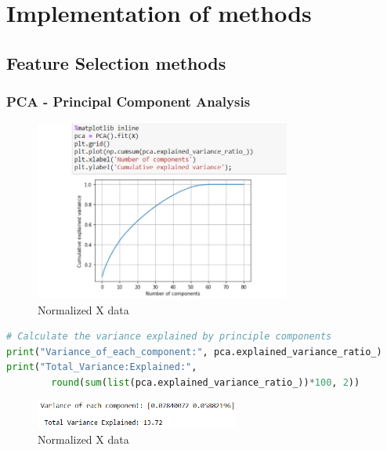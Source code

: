 \chapter{Implementation of methods}
\label{cha:implementation_methods}

\section{Feature Selection methods} %
\label{sec:feature_selection}

\subsection{PCA - Principal Component Analysis} %
\label{sec:pca}

\begin{figure}[h]
    \centering
    \includegraphics[width=0.75\textwidth,height=0.3\textheight]{Chapters/Figures/pca_components.png}
    \caption{Normalized X data}
    \label{fig:variance_graph}
\end{figure}


\begin{lstlisting}[language=Python]
# Calculate the variance explained by principle components
print("Variance_of_each_component:", pca.explained_variance_ratio_)
print("Total_Variance:Explained:", 
        round(sum(list(pca.explained_variance_ratio_))*100, 2))
\end{lstlisting}


\begin{figure}[h]
    \centering
    \includegraphics[width=0.6\textwidth,height=0.06\textheight]{Chapters/Figures/pca_2_comp_variance.png}
    \caption{Normalized X data}
    \label{fig:total_variance}
\end{figure}




